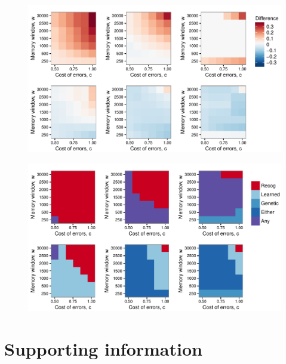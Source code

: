 \begin{figure}
\includegraphics[width=6.85in]{figures/recog_vs_learned_rule.pdf}
\caption{}
\end{figure}

\begin{figure}
\includegraphics[width=6.85in]{figures/best_type_of_learning.pdf}
\caption{}
\end{figure}

\clearpage{}
\renewcommand{\thesection}{}
\section{Supporting information}
\renewcommand{\thesection}{S}
\renewcommand{\thesubsection}{S\arabic{subsection}}
\renewcommand{\theequation}{S\arabic{equation}}
\renewcommand{\thetable}{S\arabic{table}}
\renewcommand{\thefigure}{S\arabic{figure}}
\setcounter{equation}{0}  
\setcounter{figure}{0}
\setcounter{table}{0}

